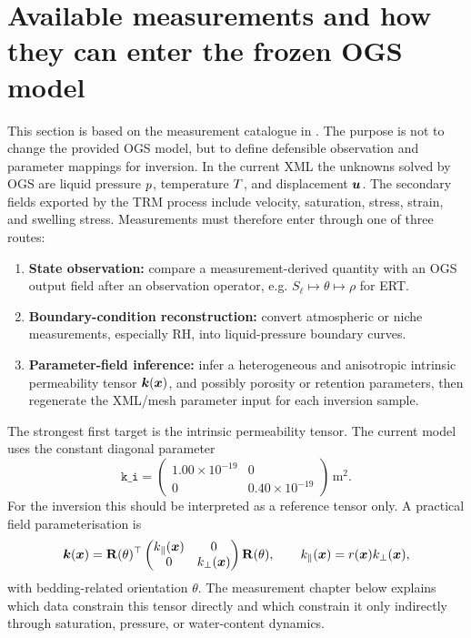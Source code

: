 \section{Available measurements and how they can enter the frozen OGS model}
\label{sec:measurements}

This section is based on the measurement catalogue in
.  The purpose is not to change the
provided OGS model, but to define defensible observation and parameter mappings for
inversion.  In the current XML the unknowns solved by OGS are liquid pressure
\(p\), temperature \(T\), and displacement \(\bm{u}\).  The secondary fields exported by
the TRM process include velocity, saturation, stress, strain, and swelling stress.
Measurements must therefore enter through one of three routes:

\begin{enumerate}[leftmargin=1.5em]
  \item \textbf{State observation:} compare a measurement-derived quantity with an OGS
  output field after an observation operator, e.g. \(S_\ell\mapsto\theta\mapsto\rho\)
  for ERT.
  \item \textbf{Boundary-condition reconstruction:} convert atmospheric or niche
  measurements, especially RH, into liquid-pressure boundary curves.
  \item \textbf{Parameter-field inference:} infer a heterogeneous and anisotropic
  intrinsic permeability tensor \(\bm{k}(\bm x)\), and possibly porosity or retention
  parameters, then regenerate the XML/mesh parameter input for each inversion sample.
\end{enumerate}

The strongest first target is the intrinsic permeability tensor.  The current model
uses the constant diagonal parameter
\[
\texttt{k\_i}=\begin{pmatrix}1.00\times10^{-19}&0\\0&0.40\times10^{-19}\end{pmatrix}
\,\mathrm{m^2}.
\]
For the inversion this should be interpreted as a reference tensor only.  A practical
field parameterisation is
\[
\bm{k}(\bm x)=
\mathbf R(\theta)^\top
\begin{pmatrix}
k_\parallel(\bm x)&0\\
0&k_\perp(\bm x)
\end{pmatrix}
\mathbf R(\theta),
\qquad
k_\parallel(\bm x)=r(\bm x)k_\perp(\bm x),
\]
with bedding-related orientation \(\theta\).  The measurement chapter below explains
which data constrain this tensor directly and which constrain it only indirectly
through saturation, pressure, or water-content dynamics.

